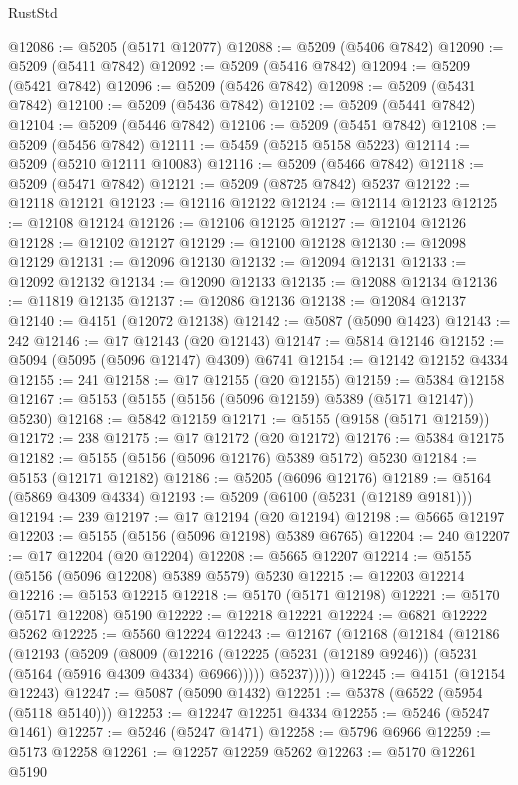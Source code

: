 \begin{lexlean}{RustStd}
\begin{coremodule}
@12086 := @5205 (@5171 @12077)
@12088 := @5209 (@5406 @7842)
@12090 := @5209 (@5411 @7842)
@12092 := @5209 (@5416 @7842)
@12094 := @5209 (@5421 @7842)
@12096 := @5209 (@5426 @7842)
@12098 := @5209 (@5431 @7842)
@12100 := @5209 (@5436 @7842)
@12102 := @5209 (@5441 @7842)
@12104 := @5209 (@5446 @7842)
@12106 := @5209 (@5451 @7842)
@12108 := @5209 (@5456 @7842)
@12111 := @5459 (@5215 @5158 @5223)
@12114 := @5209 (@5210 @12111 @10083)
@12116 := @5209 (@5466 @7842)
@12118 := @5209 (@5471 @7842)
@12121 := @5209 (@8725 @7842) @5237
@12122 := @12118 @12121
@12123 := @12116 @12122
@12124 := @12114 @12123
@12125 := @12108 @12124
@12126 := @12106 @12125
@12127 := @12104 @12126
@12128 := @12102 @12127
@12129 := @12100 @12128
@12130 := @12098 @12129
@12131 := @12096 @12130
@12132 := @12094 @12131
@12133 := @12092 @12132
@12134 := @12090 @12133
@12135 := @12088 @12134
@12136 := @11819 @12135
@12137 := @12086 @12136
@12138 := @12084 @12137
@12140 := @4151 (@12072 @12138)
@12142 := @5087 (@5090 @1423)
@12143 := 242
@12146 := @17 @12143 (@20 @12143)
@12147 := @5814 @12146
@12152 := @5094 (@5095 (@5096 @12147) @4309) @6741
@12154 := @12142 @12152 @4334
@12155 := 241
@12158 := @17 @12155 (@20 @12155)
@12159 := @5384 @12158
@12167 := @5153 (@5155 (@5156 (@5096 @12159) @5389 (@5171 @12147)) @5230)
@12168 := @5842 @12159
@12171 := @5155 (@9158 (@5171 @12159))
@12172 := 238
@12175 := @17 @12172 (@20 @12172)
@12176 := @5384 @12175
@12182 := @5155 (@5156 (@5096 @12176) @5389 @5172) @5230
@12184 := @5153 (@12171 @12182)
@12186 := @5205 (@6096 @12176)
@12189 := @5164 (@5869 @4309 @4334)
@12193 := @5209 (@6100 (@5231 (@12189 @9181)))
@12194 := 239
@12197 := @17 @12194 (@20 @12194)
@12198 := @5665 @12197
@12203 := @5155 (@5156 (@5096 @12198) @5389 @6765)
@12204 := 240
@12207 := @17 @12204 (@20 @12204)
@12208 := @5665 @12207
@12214 := @5155 (@5156 (@5096 @12208) @5389 @5579) @5230
@12215 := @12203 @12214
@12216 := @5153 @12215
@12218 := @5170 (@5171 @12198)
@12221 := @5170 (@5171 @12208) @5190
@12222 := @12218 @12221
@12224 := @6821 @12222 @5262
@12225 := @5560 @12224
@12243 := @12167
    (@12168
      (@12184
        (@12186
          (@12193
            (@5209
              (@8009
                (@12216 (@12225 (@5231 (@12189 @9246)) (@5231 (@5164 (@5916 @4309 @4334) @6966)))))
              @5237)))))
@12245 := @4151 (@12154 @12243)
@12247 := @5087 (@5090 @1432)
@12251 := @5378 (@6522 (@5954 (@5118 @5140)))
@12253 := @12247 @12251 @4334
@12255 := @5246 (@5247 @1461)
@12257 := @5246 (@5247 @1471)
@12258 := @5796 @6966
@12259 := @5173 @12258
@12261 := @12257 @12259 @5262
@12263 := @5170 @12261 @5190

\end{coremodule}
\end{lexlean}
